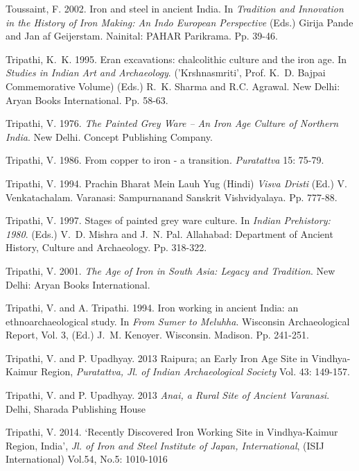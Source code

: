 \begin{thebibliography}{99}
 Toussaint, F. 2002. Iron and steel in ancient India. In \textit{Tradition and Innovation in the History of Iron Making: An Indo European Perspective} (Eds.) Girija Pande and Jan af Geijerstam. Nainital: PAHAR Parikrama. Pp. 39-46. 

 Tripathi, K.~K. 1995. Eran excavations: chalcolithic culture and the iron age. In \textit{Studies in Indian Art and Archaeology}. ('Krshnasmriti', Prof. K.~D. Bajpai Commemorative Volume) (Eds.) R.~K. Sharma and R.C. Agrawal. New Delhi: Aryan Books International. Pp. 58-63. 

 Tripathi, V. 1976. \textit{The Painted Grey Ware – An Iron Age Culture of Northern India}. New Delhi. Concept Publishing Company. 

 Tripathi, V. 1986. From copper to iron - a transition. \textit{Puratattva} 15: 75-79. 

 Tripathi, V. 1994. Prachin Bharat Mein Lauh Yug (Hindi) \textit{Visva Dristi} (Ed.) V. Venkatachalam. Varanasi: Sampurnanand Sanskrit Vishvidyalaya. Pp. 777-88.

 Tripathi, V. 1997. Stages of painted grey ware culture. In \textit{Indian Prehistory: 1980}. (Eds.) V.~D. Mishra and J.~N. Pal. Allahabad: Department of Ancient History, Culture and Archaeology. Pp. 318-322.

 Tripathi, V. 2001. \textit{The Age of Iron in South Asia: Legacy and Tradition}. New Delhi: Aryan Books International. 

 Tripathi, V. and A. Tripathi. 1994. Iron working in ancient India: an ethnoarchaeological study. In \textit{From Sumer to Meluhha}. Wisconsin Archaeological Report, Vol. 3, (Ed.) J.~M. Kenoyer. Wisconsin. Madison. Pp. 241-251.

 Tripathi, V. and P. Upadhyay. 2013 Raipura; an Early Iron Age Site in Vindhya-Kaimur Region, \textit{Puratattva, Jl. of Indian Archaeological Society} Vol. 43: 149-157.

 Tripathi, V. and P. Upadhyay. 2013 \textit{Anai, a Rural Site of Ancient Varanasi}. Delhi, Sharada Publishing House
 
 Tripathi, V. 2014. ‘Recently Discovered Iron Working Site in Vindhya-Kaimur Region, India’, \textit{Jl. of Iron and Steel Institute of Japan, International}, (ISIJ International) Vol.54, No.5: 1010-1016


\end{thebibliography}
